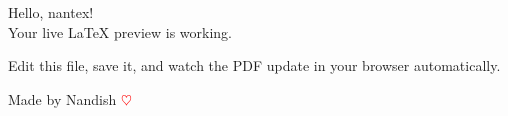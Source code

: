 \documentclass{article}
\begin{document}
\begin{center}
  {\Huge Hello, nantex!}\\[12pt]
  {\large Your live LaTeX preview is working.}
\end{center}

\vspace{1cm}
Edit this file, save it, and watch the PDF update in your browser automatically.

\vfill
\begin{center}
  \small Made by Nandish \textcolor{red}{$\heartsuit$}
\end{center}
\end{document}
